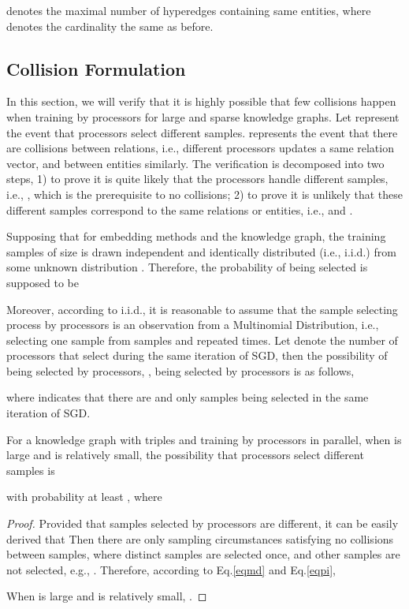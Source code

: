 \documentclass[sigconf]{acmart}
\begin{document}
denotes the maximal number of  hyperedges containing same entities, where  denotes the cardinality the same as before.



\subsection{Collision Formulation}






In this section, we will verify that it is highly possible that few collisions happen when training by  processors for large and sparse knowledge graphs. 
Let  represent the event that  processors select  different samples.
 represents the event that there are collisions between relations, i.e., different processors updates a same relation vector, and  between entities similarly.
The verification is decomposed into two steps, 1) to prove it is quite likely that the processors handle different samples, i.e., , which is the prerequisite to no collisions; 2) to prove it is unlikely that these different samples correspond to the same relations or entities, i.e.,  and  .


Supposing that for embedding methods and the knowledge graph, the training samples 
of size  is drawn independent and identically distributed (i.e., i.i.d.) from some unknown distribution . 
Therefore, the probability of  being selected  is supposed to be 

Moreover, according to i.i.d., it is reasonable to assume that the sample selecting process by  processors is an observation from a Multinomial Distribution, i.e., selecting one sample from  samples and repeated  times. 
Let  denote the number of processors that select  during the same iteration of SGD, 
then the possibility of  being selected by  processors, ,   being selected by  processors is as follows,

where  indicates that there are  and only  samples being selected in the same iteration of SGD. 

\begin{theorem}
\label{theosamp}
For a knowledge graph with  triples and training by  processors in parallel, 
when  is large and  is relatively small, the possibility that  processors select  different samples is 

with probability at least , where 

\end{theorem}

\begin{proof}
Provided that samples selected by processors are different, it can be easily derived that 
Then there are only  sampling circumstances satisfying no collisions between samples, where   distinct samples are selected once, and other  samples are not selected, e.g., .
Therefore, according to Eq.\eqref{eqmd} and Eq.\eqref{eqpi}, 




When  is large and  is relatively small, . 
\end{proof}
\end{document}
